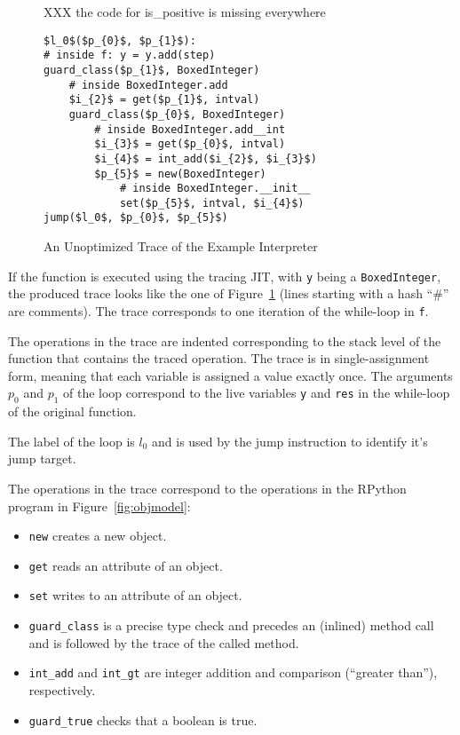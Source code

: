\documentclass[preprint]{sigplanconf}
\begin{document}
\begin{figure}
XXX the code for is\_positive is missing everywhere
\begin{lstlisting}[mathescape,numbers = right,basicstyle=\setstretch{1.05}\ttfamily\scriptsize]
$l_0$($p_{0}$, $p_{1}$):
# inside f: y = y.add(step)
guard_class($p_{1}$, BoxedInteger)
    # inside BoxedInteger.add
    $i_{2}$ = get($p_{1}$, intval)
    guard_class($p_{0}$, BoxedInteger)
        # inside BoxedInteger.add__int
        $i_{3}$ = get($p_{0}$, intval)
        $i_{4}$ = int_add($i_{2}$, $i_{3}$)
        $p_{5}$ = new(BoxedInteger)
            # inside BoxedInteger.__init__
            set($p_{5}$, intval, $i_{4}$)
jump($l_0$, $p_{0}$, $p_{5}$)
\end{lstlisting}
\caption{An Unoptimized Trace of the Example Interpreter}
\label{fig:unopt-trace}
\end{figure}

If the function is executed using the tracing JIT, with \lstinline{y} being a
\lstinline{BoxedInteger}, the produced trace looks like the one of
Figure~\ref{fig:unopt-trace} (lines starting with a hash ``\#'' are comments).
The trace corresponds to one iteration of the while-loop in \lstinline{f}.

The operations in the trace are indented
corresponding to the stack level of the function that contains the traced
operation. The trace is in single-assignment form, meaning that each variable is
assigned a value exactly once. The arguments $p_0$ and $p_1$ of the loop correspond
to the live variables \lstinline{y} and \lstinline{res} in the while-loop of
the original function.

The label of the loop is $l_0$ and is used by the jump instruction to
identify it's jump target.

The operations in the trace correspond to the operations in the RPython program
in Figure~\ref{fig:objmodel}:

\begin{itemize}
    \item \lstinline{new} creates a new object.
    \item \lstinline{get} reads an attribute of an object.
    \item \lstinline{set} writes to an attribute of an object.
    \item \lstinline{guard_class} is a precise type check and precedes an
    (inlined) method call and is followed by the trace of the called method.
    \item \lstinline{int_add} and \lstinline{int_gt} are integer addition and
    comparison (``greater than''), respectively.
    \item \lstinline{guard_true} checks that a boolean is true.
\end{itemize}
\end{document}
